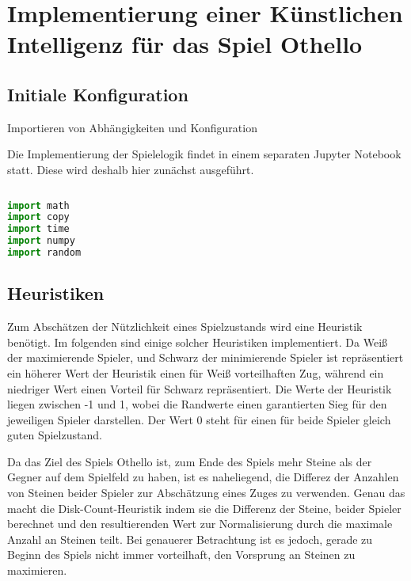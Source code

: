 \hypertarget{implementierung-einer-kuxfcnstlichen-intelligenz-fuxfcr-das-spiel-othello}{%
\section{Implementierung einer Künstlichen Intelligenz für das Spiel
Othello}\label{implementierung-einer-kuxfcnstlichen-intelligenz-fuxfcr-das-spiel-othello}}

\hypertarget{initiale-konfiguration}{%
\subsection{Initiale Konfiguration}\label{initiale-konfiguration}}

Importieren von Abhängigkeiten und Konfiguration

Die Implementierung der Spielelogik findet in einem separaten Jupyter
Notebook statt. Diese wird deshalb hier zunächst ausgeführt.

\begin{lstlisting}[language=Python]
%run othello_game.ipynb
\end{lstlisting}

\begin{lstlisting}[language=Python]
import math
import copy
import time
import numpy
import random
\end{lstlisting}

\hypertarget{heuristiken}{%
\subsection{Heuristiken}\label{heuristiken}}

Zum Abschätzen der Nützlichkeit eines Spielzustands wird eine Heuristik
benötigt. Im folgenden sind einige solcher Heuristiken implementiert. Da
Weiß der maximierende Spieler, und Schwarz der minimierende Spieler ist
repräsentiert ein höherer Wert der Heuristik einen für Weiß
vorteilhaften Zug, während ein niedriger Wert einen Vorteil für Schwarz
repräsentiert. Die Werte der Heuristik liegen zwischen -1 und 1, wobei
die Randwerte einen garantierten Sieg für den jeweiligen Spieler
darstellen. Der Wert 0 steht für einen für beide Spieler gleich guten
Spielzustand.

Da das Ziel des Spiels Othello ist, zum Ende des Spiels mehr Steine als
der Gegner auf dem Spielfeld zu haben, ist es naheliegend, die Differez
der Anzahlen von Steinen beider Spieler zur Abschätzung eines Zuges zu
verwenden. Genau das macht die Disk-Count-Heuristik indem sie die
Differenz der Steine, beider Spieler berechnet und den resultierenden
Wert zur Normalisierung durch die maximale Anzahl an Steinen teilt. Bei
genauerer Betrachtung ist es jedoch, gerade zu Beginn des Spiels nicht
immer vorteilhaft, den Vorsprung an Steinen zu maximieren.

